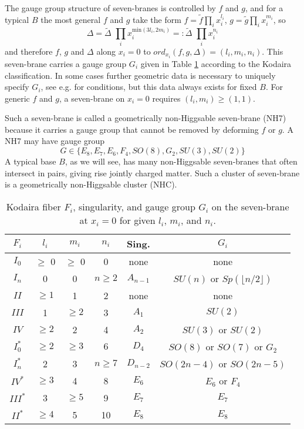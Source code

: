 \documentclass[aps,prl,twocolumn, superscriptaddress,groupedaddress,nofootinbib]{revtex4}
\def\ge{E}
\def\gso{SO}
\def\gsu{SU}
\def\gsp{Sp}
\def\gf{F}
\def\gg{G}
\begin{document}
The gauge group structure of seven-branes is controlled by $f$ and
$g$, and for a typical $B$ the most general $f$ and $g$ take the
form $f=\tilde f \prod_i x_i^{l_i}$, $g=\tilde g \prod_i x_i^{m_i}$,
so
\begin{equation}
\Delta = \tilde \Delta\,\,  \prod_i x_i^{\text{min}(3l_i,2m_i)}=: \tilde \Delta\,\,  \prod_i x_i^{n_i}
\end{equation}
and therefore $f$, $g$ and $\Delta$ along $x_i=0$ to 
$ord_{x_i}(f,g,\Delta)=(l_i,m_i,n_i).$ This seven-brane carries
a gauge group $G_i$ given in Table \ref{tab:gauge}
according to the Kodaira classification. In some cases
further geometric data is necessary to uniquely 
specify $G_i$, see e.g. 
\cite{Halverson:2015jua} for conditions, but this data
always exists for fixed $B$. 
For generic $f$ and $g$, a seven-brane on $x_i=0$
requires $(l_i,m_i)\geq(1,1)$.

Such a seven-brane is called a geometrically non-Higgsable
seven-brane (NH7) because it carries a gauge group that cannot
be removed by deforming $f$ or $g$. A NH7 may have gauge group
\begin{equation}
G\in \{E_8,E_7,E_6,F_4,SO(8),G_2,SU(3),SU(2)\}
\end{equation} 
A typical base $B$, as
we will see, has many non-Higgsable seven-branes
that often intersect in pairs, giving rise jointly charged
matter. Such a cluster of seven-brane is a
geometrically 
non-Higgsable cluster (NHC).



\begin{table}[t]
\begin{tabular}{|c|c|c|c|c|c|}
\hline
$F_i$ & $l_i$ & $m_i$ & $n_i$ & Sing. & $G_i$ \\ \hline \hline
$I_0$&$\geq $ 0 & $\geq $ 0 & 0 & none & none \\
$I_n$ &0 & 0 & $n \geq 2$ & $A_{n-1}$ & $\gsu(n)$  or $\gsp(\lfloor
n/2\rfloor)$\\
$II$ & $\geq 1$ & 1 & 2 & none & none \\
$III$ &1 & $\geq 2$ &3 & $A_1$ & $\gsu(2)$ \\
$IV$ & $\geq 2$ & 2 & 4 & $A_2$ & $\gsu(3)$  or $\gsu(2)$\\
$I_0^*$&
$\geq 2$ & $\geq 3$ & $6$ &$D_{4}$ & $\gso(8)$ or $\gso(7)$ or $\gg_2$ \\
$I_n^*$&
2 & 3 & $n \geq 7$ & $D_{n -2}$ & $\gso(2n-4)$  or $\gso(2n -5)$ \\
$IV^*$& $\geq 3$ & 4 & 8 & $E_6$ & $\ge_6$  or $\gf_4$\\
$III^*$&3 & $\geq 5$ & 9 & $E_7$ & $\ge_7$ \\
$II^*$& $\geq 4$ & 5 & 10 & $E_8$ & $\ge_8$ \\ \hline
\end{tabular}
\caption{Kodaira fiber $F_i$, singularity, and gauge group $G_i$ on
the seven-brane at $x_i=0$ for given $l_i$, $m_i$, and $n_i$.}
\label{tab:gauge}
\end{table}
\end{document}
